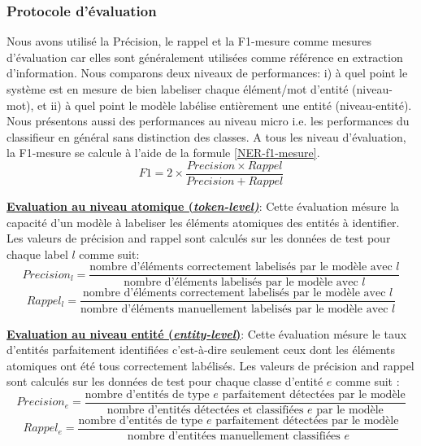 \subsubsection{Protocole d'évaluation}
Nous avons utilisé la Précision, le rappel et la F1-mesure comme mesures d'évaluation car elles sont généralement utilisées comme référence en extraction d'information. Nous comparons deux niveaux de performances: i) à quel point le système est en mesure de bien labeliser chaque élément/mot d'entité (niveau-mot), et ii) à quel point le modèle labélise entièrement une entité (niveau-entité). Nous présentons aussi des performances au niveau micro i.e. les performances du classifieur en général sans distinction des classes. A tous les niveau d'évaluation, la F1-mesure se calcule à l'aide de la formule \ref{NER-f1-mesure}.  
\begin{equation}\label{NER-f1-mesure}
F1 = 2 \times \frac{Precision \times Rappel} {Precision + Rappel}
\end{equation}

\vspace{0.3cm}

\noindent \underline{\textbf{Evaluation au niveau atomique (\textit{token-level)}}}: Cette évaluation mésure la capacité d'un modèle à labeliser les éléments atomiques des entités à identifier. Les valeurs de précision and rappel sont calculés sur les données de test pour chaque label $l$ comme suit:
\[Precision_l = \frac{\text{nombre d'éléments correctement labelisés par le modèle avec } l} {\text{nombre d'éléments labelisés par le modèle avec } l}\]
\[Rappel_l = \frac{\text{nombre d'éléments correctement labelisés par le modèle avec } l} {\text{nombre d'éléments manuellement labelisés par le modèle avec } l}\]

\vspace{0.3cm}

\noindent \underline{\textbf{Evaluation au niveau entité (\textit{entity-level})}}: Cette évaluation mésure le taux d'entités parfaitement identifiées c'est-à-dire seulement ceux dont les éléments atomiques ont été tous correctement labélisés. Les valeurs de précision and rappel sont calculés sur les données de test pour chaque classe d'entité $e$ comme suit :
\[Precision_e = \frac{\text{nombre d'entités de type } e \text{ parfaitement détectées par le modèle}} {\text{nombre d'entités détectées et classifiées } e\text{ par le modèle}}\]
\[Rappel_e = \frac{\text{nombre d'entités de type } e \text{ parfaitement détectées par le modèle}} {\text{nombre d'entitées manuellement classifiées } e}\]

